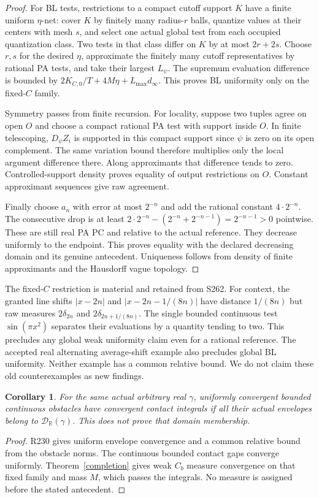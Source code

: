 \documentclass[11pt]{article}
\newtheorem{corollary}[theorem]{Corollary}
\newcommand{\R}{\mathbb R}
\begin{document}
\begin{proof}
For BL tests, restrictions to a compact cutoff support $K$ have a
finite uniform $\eta$-net: cover $K$ by finitely many radius-$r$
balls, quantize values at their centers with mesh $s$, and select
one actual global test from each occupied quantization class.
Two tests in that class differ on $K$ by at most $2r+2s$.
Choose $r,s$ for the desired $\eta$, approximate the finitely many
cutoff representatives by rational PA tests, and take their largest
$L_\psi$. The supremum evaluation difference is bounded by
$2K_{C,0}/T+4M\eta+L_{\max}d_\infty$. This proves BL uniformity
only on the fixed-$C$ family.

Symmetry passes from finite recursion. For locality, suppose two
tuples agree on open $O$ and choose a compact rational PA test with
support inside $O$. In finite telescoping, $D_\psi Z_i$ is supported
in this compact support since $\psi$ is zero on its open complement.
The same variation bound therefore multiplies only the local
argument difference there. Along approximants that difference
tends to zero. Controlled-support density proves equality of
output restrictions on $O$. Constant approximant sequences give
raw agreement.

Finally choose $a_n$ with error at most $2^{-n}$ and add the rational
constant $4\cdot2^{-n}$. The consecutive drop is at least
$2\cdot2^{-n}-(2^{-n}+2^{-n-1})=2^{-n-1}>0$ pointwise.
These are still real PA PC and relative to the actual reference.
They decrease uniformly to the endpoint. This proves equality
with the declared decreasing domain and its genuine antecedent.
Uniqueness follows from density of finite approximants and the
Hausdorff vague topology.
\end{proof}

The fixed-$C$ restriction is material and retained from S262.
For context, the granted line shifts $|x-2n|$ and
$|x-2n-1/(8n)|$ have distance $1/(8n)$ but raw measures
$2\delta_{2n}$ and $2\delta_{2n+1/(8n)}$. The single bounded
continuous test $\sin(\pi x^2)$ separates their evaluations by a
quantity tending to two. This precludes any global weak uniformity
claim even for a rational reference. The accepted real alternating
average-shift example also precludes global BL uniformity. Neither
example has a common relative bound. We do not claim these old
counterexamples as new findings.

\begin{corollary}\label{stability}
For the same actual arbitrary real $\gamma$, uniformly convergent
bounded continuous obstacles have convergent contact integrals
\emph{if all their actual envelopes belong to}
$\mathcal D_\R(\gamma)$. This does not prove that domain membership.
\end{corollary}
\begin{proof}
R230 gives uniform envelope convergence and a common relative bound
from the obstacle norms. The continuous bounded contact gaps converge
uniformly. Theorem~\ref{completion} gives weak $C_b$ measure
convergence on that fixed family and mass $M$, which passes the
integrals. No measure is assigned before the stated antecedent.
\end{proof}
\end{document}
